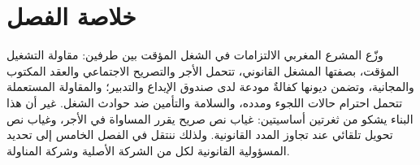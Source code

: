 \section*{خلاصة الفصل}

وزّع المشرع المغربي الالتزامات في الشغل المؤقت بين طرفين: مقاولة التشغيل المؤقت، بصفتها المشغل القانوني، تتحمل الأجر والتصريح الاجتماعي والعقد المكتوب والمجانية، وتضمن ديونها كفالةٌ مودعة لدى صندوق الإيداع والتدبير؛ والمقاولة المستعملة تتحمل احترام حالات اللجوء ومدده، والسلامة والتأمين ضد حوادث الشغل. غير أن هذا البناء يشكو من ثغرتين أساسيتين: غياب نص صريح يقرر المساواة في الأجر، وغياب نص تحويل تلقائي عند تجاوز المدد القانونية. ولذلك ننتقل في الفصل الخامس إلى تحديد المسؤولية القانونية لكل من الشركة الأصلية وشركة المناولة.
